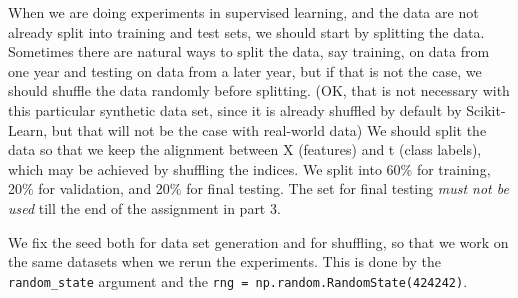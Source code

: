 \documentclass[a4paper,landscape]{article}
\begin{document}
When we are doing experiments in supervised learning, and the data are
not already split into training and test sets, we should start by
splitting the data. Sometimes there are natural ways to split the data,
say training, on data from one year and testing on data from a later
year, but if that is not the case, we should shuffle the data randomly
before splitting. (OK, that is not necessary with this particular
synthetic data set, since it is already shuffled by default by
Scikit-Learn, but that will not be the case with real-world data) We
should split the data so that we keep the alignment between X (features)
and t (class labels), which may be achieved by shuffling the indices. We
split into 60\% for training, 20\% for validation, and 20\% for final
testing. The set for final testing \emph{must not be used} till the end
of the assignment in part 3.

We fix the seed both for data set generation and for shuffling, so that
we work on the same datasets when we rerun the experiments. This is done
by the \texttt{random\_state} argument and the
\texttt{rng\ =\ np.random.RandomState(424242)}.
\end{document}
